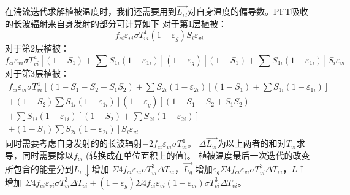 在湍流迭代求解植被温度时，我们还需要用到$\overrightarrow{L_{vl}}$对自身温度的偏导数。PFT吸收的长波辐射来自身发射的部分可计算如下
对于第1层植被：
\begin{equation}
f_{ci} \varepsilon_{vi} \sigma T_{vi}^{4}\left(1-\varepsilon_{g}\right) S_{i} \varepsilon_{vi}
\end{equation}
对于第2层植被：
\begin{equation}
f_{ci} \varepsilon_{vi} \sigma T_{vi}^{4}\left[\left(1-S_{1}\right)+\sum S_{1 i}\left(1-\varepsilon_{1 i}\right)\right]
\left(1-\varepsilon_{g}\right)\left[\left(1-S_{1}\right)+\sum S_{1 i}\left(1-\varepsilon_{1 i}\right)\right] S_{i} \varepsilon_{vi}
\end{equation}
对于第3层植被：
\begin{equation}
\begin{aligned} 
    f_{c i} \varepsilon_{v i} \sigma T_{v i}^{4}\left[\left(1-S_{1}-S_{2}+S_{1} S_{2}\right)+
    \sum S_{2 i}\left(1-\varepsilon_{2 i}\right)\left[\left(1-S_{1}\right)+\sum S_{1 i}\left(1-\varepsilon_{1 i}\right)\right]\right.\\ 
    \left.+\left(1-S_{2}\right) \sum S_{1 i}\left(1-\varepsilon_{1 i}\right)\right]\left(1-\varepsilon_{g}\right)\left[\left(1-S_{1}-S_{2}+S_{1} S_{2}\right)\right.\\ 
    +\sum S_{1 i}\left(1-\varepsilon_{1 i}\right)\left[\left(1-S_{2}\right)+\sum S_{2 i}\left(1-\varepsilon_{2 i}\right)\right] \\ 
    \left.+\left(1-S_{1}\right) 
    \sum S_{2 i}\left(1-\varepsilon_{2 i}\right)\right] S_{i} \varepsilon_{v i} \end{aligned}
\end{equation}
同时需要考虑自身发射的的长波辐射$-2f_{ci}\varepsilon_{vi}\sigma T_{vi}^4$。
$\Delta \overrightarrow{L_{vi}}$为以上两者的和对$T_{vi}$求导，同时需要除以$f_{ci}$ (转换成在单位面积上的值)。 
植被温度最后一次迭代的改变所包含的能量分到$L_v\downarrow$增加
$\Sigma4f_{ci}\varepsilon_{vi}\sigma T_{vi}^3\Delta T_{vi}$，$\overrightarrow{L_{g}}$
增加$\varepsilon_g\Sigma4f_{ci}\varepsilon_{vi}\sigma T_{vi}^3\Delta T_{vi}$，$L\uparrow$增加
$\Sigma 4 f_{ci} \varepsilon_{vi} \sigma T_{vi}^{3} \Delta T_{vi}+\left(1-\varepsilon_{g}\right) \Sigma 4 f_{ci} 
\varepsilon_{vi}\left(1-\varepsilon_{vi}\right) \sigma T_{vi}^{3} \Delta T_{vi}$。

